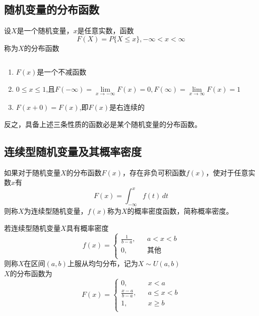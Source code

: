 \subsection{随机变量的分布函数}
\begin{definition}[随机变量的分布函数]
    设$X$是一个随机变量，$x$是任意实数，函数
    $$F(X)=P\{X\leq x\},-\infty<x<\infty$$
    称为$X$的分布函数
\end{definition}

\begin{theorem}[分布函数性质]
      $\quad$  

    \begin{enumerate}
        \item $F(x)$是一个不减函数
        \item $0\leq x\leq 1$,且$F(-\infty)=\lim\limits_{x \to -\infty}  F(x)=0,F(\infty)=\lim\limits_{x \to \infty}  F(x)=1$
        \item $F(x+0)=F(x)$,即$F(x)$是右连续的
    \end{enumerate}

    反之，具备上述三条性质的函数必是某个随机变量的分布函数。
\end{theorem}

\subsection{连续型随机变量及其概率密度}
\begin{definition}
    如果对于随机变量$X$的分布函数$F(x)$，存在非负可积函数$f(x)$，使对于任意实数$x$有
    $$F(x)=\int_{-\infty}^{x} f(t) \,dt $$
    则称$X$为{\heiti 连续型随机变量}，$f(x)$称为$X$的概率密度函数，简称{\heiti 概率密度}。
\end{definition}

\begin{definition}[均匀分布]
    若连续型随机变量$X$具有概率密度
    $$ f(x)=\left\{
    \begin{array}{lll}
    \frac{1}{b-a}, &  & a<x<b\\
    0,&  &  \mbox{其他} \\
    \end{array}\right. $$
    则称$X$在区间$(a,b)$上服从均匀分布，记为$X\sim U(a,b)$\\
    $X$的分布函数为
    $$ F(x)=\left\{
        \begin{array}{lll}
        0, &  & x<a\\
        \frac{x-a}{b-a}, &  &a\leq x<b\\
        1,&  &  x\geq b \\
        \end{array}\right. $$
\end{definition}

